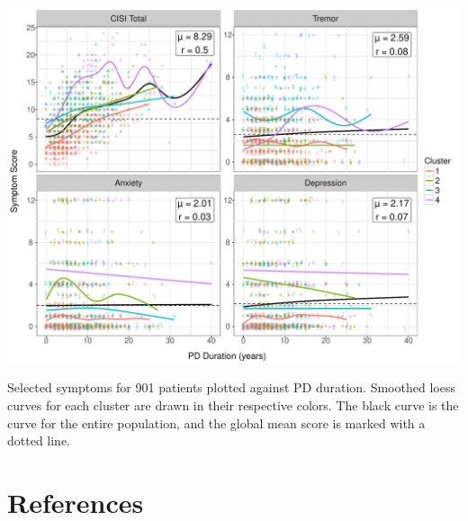 \documentclass[preprint,5p]{elsarticle} %
\begin{document}
\begin{suppfigure*}[p]
  \centering
  \includegraphics[width=0.8\linewidth]{long4-d.pdf}
  \caption{Selected symptoms for 901 patients plotted against PD duration. Smoothed loess curves for each cluster
  are drawn in their respective colors. The black curve is the curve for the entire population, and
the global mean score is marked with a dotted line.}
  \label{fig:long4}
\end{suppfigure*}


\section{References}


\end{document}
